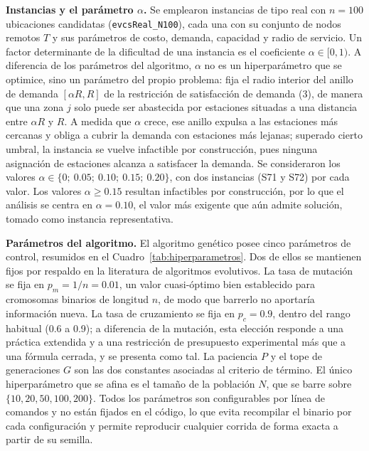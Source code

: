 \documentclass[letter, 10pt]{article}
\begin{document}
\textbf{Instancias y el parámetro $\alpha$.} Se emplearon instancias de tipo real con $n = 100$
ubicaciones candidatas (\texttt{evcsReal\_N100}), cada una con su conjunto de nodos remotos $T$ y
sus parámetros de costo, demanda, capacidad y radio de servicio. Un factor determinante de la
dificultad de una instancia es el coeficiente $\alpha \in [0, 1)$. A diferencia de los parámetros
del algoritmo, $\alpha$ no es un hiperparámetro que se optimice, sino un parámetro del propio
problema: fija el radio interior del anillo de demanda $[\alpha R, R]$ de la restricción de
satisfacción de demanda (3), de manera que una zona $j$ solo puede ser abastecida por estaciones
situadas a una distancia entre $\alpha R$ y $R$. A medida que $\alpha$ crece, ese anillo expulsa a
las estaciones más cercanas y obliga a cubrir la demanda con estaciones más lejanas; superado
cierto umbral, la instancia se vuelve infactible por construcción, pues ninguna asignación de
estaciones alcanza a satisfacer la demanda. Se consideraron los valores
$\alpha \in \{0;\ 0.05;\ 0.10;\ 0.15;\ 0.20\}$, con dos instancias (S71 y S72) por cada valor. Los
valores $\alpha \geq 0.15$ resultan infactibles por construcción, por lo que el análisis se centra
en $\alpha = 0.10$, el valor más exigente que aún admite solución, tomado como instancia
representativa.

\textbf{Parámetros del algoritmo.} El algoritmo genético posee cinco parámetros de control,
resumidos en el Cuadro~\ref{tab:hiperparametros}. Dos de ellos se mantienen fijos por respaldo en
la literatura de algoritmos evolutivos. La tasa de mutación se fija en $p_m = 1/n = 0.01$, un valor
cuasi-óptimo bien establecido para cromosomas binarios de longitud $n$, de modo que barrerlo no
aportaría información nueva. La tasa de cruzamiento se fija en $p_c = 0.9$, dentro del rango
habitual (0.6 a 0.9); a diferencia de la mutación, esta elección responde a una práctica extendida
y a una restricción de presupuesto experimental más que a una fórmula cerrada, y se presenta como
tal. La paciencia $P$ y el tope de generaciones $G$ son las dos constantes asociadas al criterio de
término. El único hiperparámetro que se afina es el tamaño de la población $N$, que se barre sobre
$\{10, 20, 50, 100, 200\}$. Todos los parámetros son configurables por línea de comandos y no están
fijados en el código, lo que evita recompilar el binario por cada configuración y permite
reproducir cualquier corrida de forma exacta a partir de su semilla.
\end{document}
